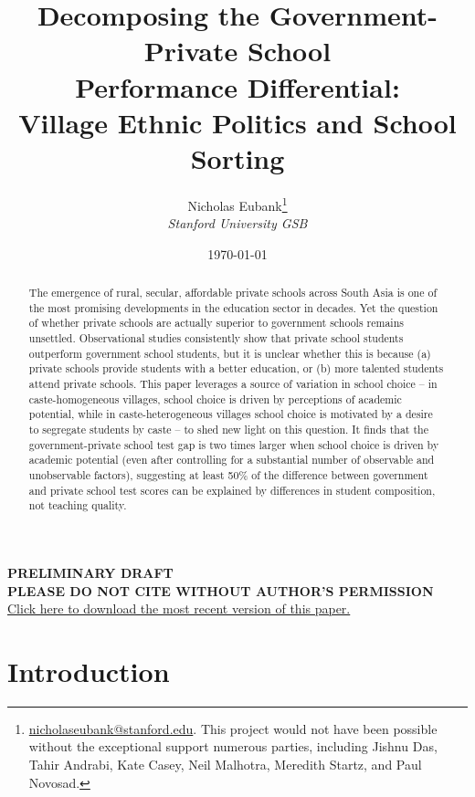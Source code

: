 \documentclass[11pt]{article}
\title{Decomposing the Government-Private School \\ Performance Differential: \\ Village Ethnic Politics and School Sorting}
\author{Nicholas Eubank\footnote{\href{mailto:nicholaseubank@stanford.edu}{nicholaseubank@stanford.edu}. This project would not have been possible without the exceptional support numerous parties, including Jishnu Das, Tahir Andrabi, Kate Casey, Neil Malhotra, Meredith Startz, and Paul Novosad.} \\ \emph{Stanford University GSB}}
\date{\today}
\begin{document}
 
\maketitle
\begin{center}
\vspace{3cm}

\textbf{PRELIMINARY DRAFT \\ PLEASE DO NOT CITE WITHOUT AUTHOR'S PERMISSION} \\

\vspace{0.1cm}
\color{blue}\href{http://www.nickeubank.com/eubank_schoolsorting/}{Click here to download the most recent version of this paper.}\color{black}
\end{center}

\begin{abstract}
The emergence of rural, secular, affordable private schools across South Asia is one of the most promising developments in the education sector in decades. Yet the question of whether private schools are actually superior to government schools remains unsettled. Observational studies consistently show that private school students outperform government school students, but it is unclear whether this is because (a) private schools provide students with a better education, or (b) more talented students attend private schools. This paper leverages a source of variation in school choice -- in caste-homogeneous villages, school choice is driven by perceptions of academic potential, while in caste-heterogeneous villages school choice is motivated by a desire to segregate students by caste -- to shed new light on this question. It finds that the government-private school test gap is two times larger when school choice is driven by academic potential (even after controlling for a substantial number of observable and unobservable factors), suggesting at least 50\% of the difference between government and private school test scores can be explained by differences in student composition, not teaching quality. 
\end{abstract}

\thispagestyle{empty}



\pagebreak

\setcounter{page}{1}


\section{Introduction}\label{}
\end{document}
